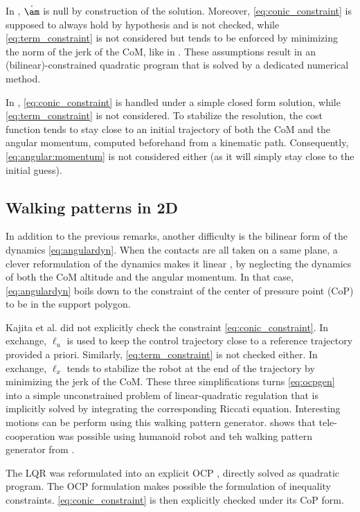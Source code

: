 In \cite{perrin_isrr15}, $\dot \am$ is null by construction of the solution. Moreover, \eqref{eq:conic_constraint} is supposed to always hold by hypothesis and is not checked, while \eqref{eq:term_constraint} is not considered but tends to be enforced by minimizing the norm of the jerk of the CoM, like in \cite{Kajita:icra:2003}. These assumptions result in an (bilinear)-constrained quadratic program that is solved by a dedicated numerical method.

In \cite{rotella_humanoid15}, \eqref{eq:conic_constraint} is handled under a simple closed form solution, while \eqref{eq:term_constraint} is not considered. To stabilize the resolution, the cost function tends to stay close to an initial trajectory of both the CoM and the angular momentum, computed beforehand from a kinematic path. Consequently, \eqref{eq:angular:momentum} is not considered either (as it will simply stay close to the initial guess).

\subsection*{Walking patterns in 2D}
In addition to the previous remarks, another difficulty is the bilinear form of the dynamics \eqref{eq:angulardyn}.
When the contacts are all taken on a same plane, a clever reformulation of the dynamics makes it linear \cite{Kajita:icra:2003}, by neglecting the dynamics of both the CoM altitude and the angular momentum. In that case, \eqref{eq:angulardyn} boils down to the constraint of the center of pressure point (CoP) to be in the support polygon.

Kajita et al. \cite{Kajita:icra:2003} did not explicitly check the constraint \eqref{eq:conic_constraint}.
In exchange, $\ell_u$ is used to keep the control trajectory close to a reference trajectory provided a priori.
Similarly, \eqref{eq:term_constraint} is not checked either.
In exchange, $\ell_x$ tends to stabilize the robot at the end of the trajectory by minimizing the jerk of the CoM.
These three simplifications turns \eqref{eq:ocpgen} into a simple unconstrained problem of linear-quadratic regulation that is implicitly solved by integrating the corresponding Riccati equation.
Interesting motions can be perform using this walking pattern generator.
\cite{evrard2009intercontinental} shows that tele-cooperation was possible using humanoid robot and teh walking pattern generator from \cite{Kajita:icra:2003}.

The LQR was reformulated into an explicit OCP \cite{herdt:ar:2010}, directly solved as quadratic program.
The OCP formulation makes possible the formulation of inequality constraints.
\eqref{eq:conic_constraint} is then explicitly checked under its CoP form.


